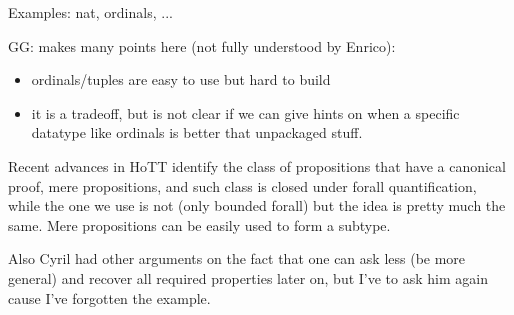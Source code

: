 \mcbREQUIRE{}


Examples: nat, ordinals, ...

GG: makes many points here (not fully understood by Enrico):
\begin{itemize}
\item ordinals/tuples are easy to use but hard to build
\item it is a tradeoff, but is not clear if we can give hints on when
	a specific datatype like ordinals is better that unpackaged
	stuff.
\end{itemize}

\mcbPROVIDE{}
\mcbREQUIRE{}

Recent advances in HoTT identify the class of propositions that have a
canonical proof, mere propositions, and such class is closed under
forall quantification, while the one we use is not (only bounded
forall) but the idea is pretty much the same.  Mere propositions can
be easily used to form a subtype.

Also Cyril had other arguments on the fact that one can
ask less (be more general) and recover all required properties later
on, but I've to ask him again cause I've forgotten the example.



